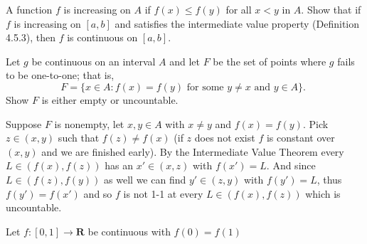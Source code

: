 \begin{exercise}
  A function $f$ is increasing on $A$ if $f(x) \leq f(y)$ for all $x<y$ in $A$. Show that if $f$ is increasing on $[a, b]$ and satisfies the intermediate value property (Definition 4.5.3), then $f$ is continuous on $[a, b]$.
\end{exercise}
\begin{solution}
  \TODO
\end{solution}

\begin{exercise}
  Let $g$ be continuous on an interval $A$ and let $F$ be the set of points where $g$ fails to be one-to-one; that is,
  $$
  F=\{x \in A: f(x)=f(y) \text { for some } y \neq x \text { and } y \in A\} \text {. }
  $$
  Show $F$ is either empty or uncountable.
\end{exercise}
\begin{solution}
  Suppose $F$ is nonempty, let $x,y \in A$ with $x \ne y$ and $f(x) = f(y)$. Pick $z \in (x,y)$ such that $f(z) \ne f(x)$ (if $z$ does not exist $f$ is constant over $(x,y)$ and we are finished early). By the Intermediate Value Theorem every $L \in (f(x), f(z))$ has an $x' \in (x, z)$ with $f(x') = L$. And since $L \in (f(z), f(y))$ as well we can find $y' \in (z,y)$ with $f(y') = L$, thus $f(y') = f(x')$ and so $f$ is not 1-1 at every $L \in (f(x), f(z))$ which is uncountable.
\end{solution}

\begin{exercise}
\end{exercise}
\begin{solution}
  \TODO
\end{solution}

\begin{exercise}
  Let $f:[0,1] \rightarrow \mathbf{R}$ be continuous with $f(0)=f(1)$
\end{exercise}
\begin{solution}
  \TODO
\end{solution}

